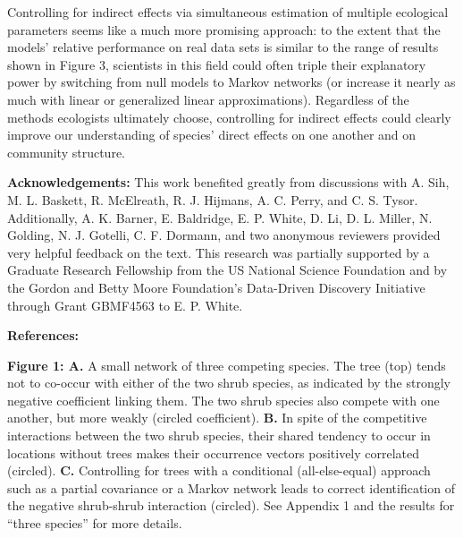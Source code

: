 \documentclass[12pt,]{article}
\begin{document}
\begin{spacing}{1.9}
\begin{flushleft}
Controlling for indirect effects via simultaneous estimation of multiple
ecological parameters seems like a much more promising approach: to the
extent that the models' relative performance on real data sets is
similar to the range of results shown in Figure 3, scientists in this
field could often triple their explanatory power by switching from null
models to Markov networks (or increase it nearly as much with linear or
generalized linear approximations). Regardless of the methods ecologists
ultimately choose, controlling for indirect effects could clearly
improve our understanding of species' direct effects on one another and
on community structure.

\noindent \textbf{Acknowledgements:} This work benefited greatly from
discussions with A. Sih, M. L. Baskett, R. McElreath, R. J. Hijmans, A.
C. Perry, and C. S. Tysor. Additionally, A. K. Barner, E. Baldridge, E.
P. White, D. Li, D. L. Miller, N. Golding, N. J. Gotelli, C. F. Dormann,
and two anonymous reviewers provided very helpful feedback on the text.
This research was partially supported by a Graduate Research Fellowship
from the US National Science Foundation and by the Gordon and Betty
Moore Foundation's Data-Driven Discovery Initiative through Grant
GBMF4563 to E. P. White.

\setlength{\parindent}{0cm}

\noindent \textbf{References:}

\setlength{\parindent}{-1em} \setlength{\leftskip}{1em}
\setlength{\parskip}{0pt}

\textbf{Figure 1: A.} A small network of three competing species. The
tree (top) tends not to co-occur with either of the two shrub species,
as indicated by the strongly negative coefficient linking them. The two
shrub species also compete with one another, but more weakly (circled
coefficient). \textbf{B.} In spite of the competitive interactions
between the two shrub species, their shared tendency to occur in
locations without trees makes their occurrence vectors positively
correlated (circled). \textbf{C.} Controlling for trees with a
conditional (all-else-equal) approach such as a partial covariance or a
Markov network leads to correct identification of the negative
shrub-shrub interaction (circled). See Appendix 1 and the results for
``three species'' for more details.


\end{flushleft}
\end{spacing}
\end{document}
